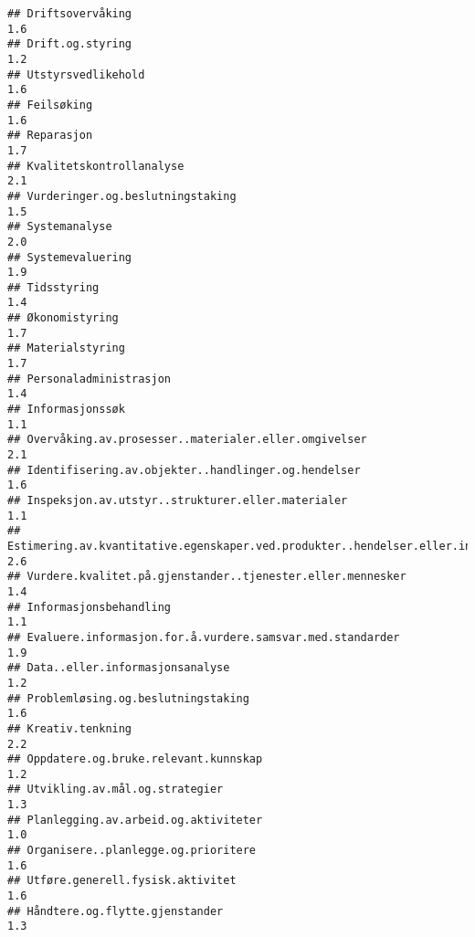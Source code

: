 \documentclass[
]{article}
\begin{document}
\begin{verbatim}
## Driftsovervåking                                                                 1.6
## Drift.og.styring                                                                 1.2
## Utstyrsvedlikehold                                                               1.6
## Feilsøking                                                                       1.6
## Reparasjon                                                                       1.7
## Kvalitetskontrollanalyse                                                         2.1
## Vurderinger.og.beslutningstaking                                                 1.5
## Systemanalyse                                                                    2.0
## Systemevaluering                                                                 1.9
## Tidsstyring                                                                      1.4
## Økonomistyring                                                                   1.7
## Materialstyring                                                                  1.7
## Personaladministrasjon                                                           1.4
## Informasjonssøk                                                                  1.1
## Overvåking.av.prosesser..materialer.eller.omgivelser                             2.1
## Identifisering.av.objekter..handlinger.og.hendelser                              1.6
## Inspeksjon.av.utstyr..strukturer.eller.materialer                                1.1
## Estimering.av.kvantitative.egenskaper.ved.produkter..hendelser.eller.informasjon 2.6
## Vurdere.kvalitet.på.gjenstander..tjenester.eller.mennesker                       1.4
## Informasjonsbehandling                                                           1.1
## Evaluere.informasjon.for.å.vurdere.samsvar.med.standarder                        1.9
## Data..eller.informasjonsanalyse                                                  1.2
## Problemløsing.og.beslutningstaking                                               1.6
## Kreativ.tenkning                                                                 2.2
## Oppdatere.og.bruke.relevant.kunnskap                                             1.2
## Utvikling.av.mål.og.strategier                                                   1.3
## Planlegging.av.arbeid.og.aktiviteter                                             1.0
## Organisere..planlegge.og.prioritere                                              1.6
## Utføre.generell.fysisk.aktivitet                                                 1.6
## Håndtere.og.flytte.gjenstander                                                   1.3

\end{verbatim}
\end{document}
